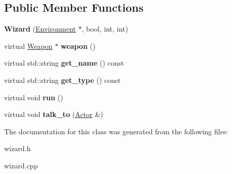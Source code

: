 \subsection*{Public Member Functions}
\begin{DoxyCompactItemize}
\item 
\hypertarget{classda__game_1_1Wizard_a12946b6b8b4377d3bc921f4acec267af}{
{\bfseries Wizard} (\hyperlink{classda__game_1_1Environment}{Environment} $\ast$, bool, int, int)}
\label{classda__game_1_1Wizard_a12946b6b8b4377d3bc921f4acec267af}

\item 
\hypertarget{classda__game_1_1Wizard_aea51ce7fcb9f92ca5176f5cbcbcb6775}{
virtual \hyperlink{classda__game_1_1Weapon}{Weapon} $\ast$ {\bfseries weapon} ()}
\label{classda__game_1_1Wizard_aea51ce7fcb9f92ca5176f5cbcbcb6775}

\item 
\hypertarget{classda__game_1_1Wizard_a774b9675e1817c6f7c2d0852a6c2f3bb}{
virtual std::string {\bfseries get\_\-name} () const }
\label{classda__game_1_1Wizard_a774b9675e1817c6f7c2d0852a6c2f3bb}

\item 
\hypertarget{classda__game_1_1Wizard_afd862632f5d1f6e2f0c0305226b3ebfd}{
virtual std::string {\bfseries get\_\-type} () const }
\label{classda__game_1_1Wizard_afd862632f5d1f6e2f0c0305226b3ebfd}

\item 
\hypertarget{classda__game_1_1Wizard_a242950311ea6d71faf9dfeb86918e510}{
virtual void {\bfseries run} ()}
\label{classda__game_1_1Wizard_a242950311ea6d71faf9dfeb86918e510}

\item 
\hypertarget{classda__game_1_1Wizard_aae7693d908c0e2d79bfc527cdb270548}{
virtual void {\bfseries talk\_\-to} (\hyperlink{classda__game_1_1Actor}{Actor} \&)}
\label{classda__game_1_1Wizard_aae7693d908c0e2d79bfc527cdb270548}

\end{DoxyCompactItemize}


The documentation for this class was generated from the following files:\begin{DoxyCompactItemize}
\item 
wizard.h\item 
wizard.cpp\end{DoxyCompactItemize}
